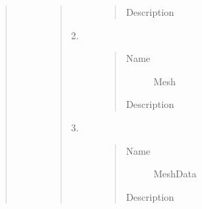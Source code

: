 \documentclass[letterpaper,10pt,english]{sphinxmanual}
\begin{document}
\begin{quote}
\begin{description}
\begin{quote}
\begin{description}
\begin{quote}
\begin{description}
\item[{Description}] \leavevmode
{}

\end{description}\end{quote}

\item[{2.}] \leavevmode\begin{quote}\begin{description}
\item[{Name}] \leavevmode
Mesh

\item[{Description}] \leavevmode
{}

\end{description}\end{quote}

\item[{3.}] \leavevmode\begin{quote}\begin{description}
\item[{Name}] \leavevmode
MeshData

\item[{Description}] \leavevmode
{}

\end{description}\end{quote}

\end{description}\end{quote}

\end{description}\end{quote}
\end{document}
